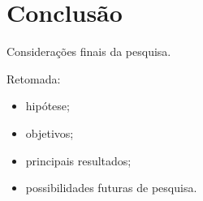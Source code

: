 \chapter{Conclusão}

Considerações finais da pesquisa.

Retomada:

\begin{itemize}
    \item hipótese;
    \item objetivos;
    \item principais resultados;
    \item possibilidades futuras de pesquisa.
\end{itemize}